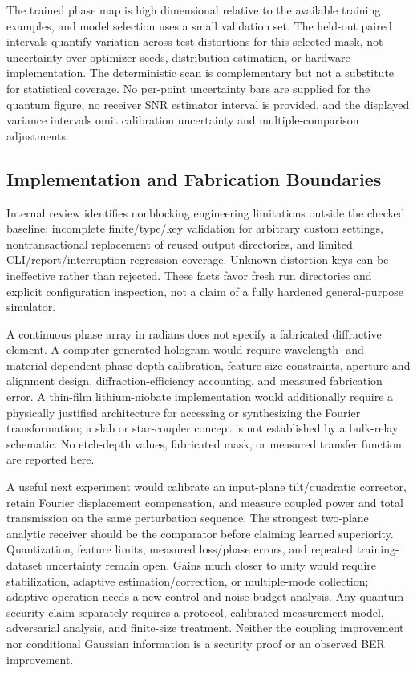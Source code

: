 \documentclass[journal]{IEEEtran}
\begin{document}
The trained phase map is high dimensional relative to the available training examples, and model selection uses a small validation set. The held-out paired intervals quantify variation across test distortions for this selected mask, not uncertainty over optimizer seeds, distribution estimation, or hardware implementation. The deterministic scan is complementary but not a substitute for statistical coverage. No per-point uncertainty bars are supplied for the quantum figure, no receiver SNR estimator interval is provided, and the displayed variance intervals omit calibration uncertainty and multiple-comparison adjustments.

\subsection{Implementation and Fabrication Boundaries}
Internal review identifies nonblocking engineering limitations outside the checked baseline: incomplete finite/type/key validation for arbitrary custom settings, nontransactional replacement of reused output directories, and limited CLI/report/interruption regression coverage. Unknown distortion keys can be ineffective rather than rejected. These facts favor fresh run directories and explicit configuration inspection, not a claim of a fully hardened general-purpose simulator.

A continuous phase array in radians does not specify a fabricated diffractive element. A computer-generated hologram would require wavelength- and material-dependent phase-depth calibration, feature-size constraints, aperture and alignment design, diffraction-efficiency accounting, and measured fabrication error. A thin-film lithium-niobate implementation would additionally require a physically justified architecture for accessing or synthesizing the Fourier transformation; a slab or star-coupler concept is not established by a bulk-relay schematic. No etch-depth values, fabricated mask, or measured transfer function are reported here.

A useful next experiment would calibrate an input-plane tilt/quadratic corrector, retain Fourier displacement compensation, and measure coupled power and total transmission on the same perturbation sequence. The strongest two-plane analytic receiver should be the comparator before claiming learned superiority. Quantization, feature limits, measured loss/phase errors, and repeated training-dataset uncertainty remain open. Gains much closer to unity would require stabilization, adaptive estimation/correction, or multiple-mode collection; adaptive operation needs a new control and noise-budget analysis. Any quantum-security claim separately requires a protocol, calibrated measurement model, adversarial analysis, and finite-size treatment. Neither the coupling improvement nor conditional Gaussian information is a security proof or an observed BER improvement.
\end{document}
